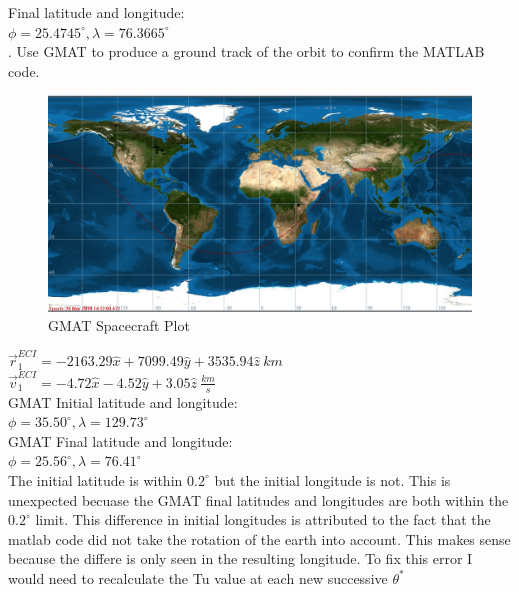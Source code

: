 \documentclass[hidelinks,12pt]{article}
\begin{document}
Final latitude and longitude:\\
$\phi = 25.4745^\circ, \lambda = 76.3665^\circ$\\
\vspace{5px}
. Use GMAT to produce a ground track of the orbit to confirm the MATLAB code.\\
\begin{figure}[!htb]
  \center
  \includegraphics[scale=0.6]{GMAT}
  \caption{GMAT Spacecraft Plot}
  \label{}
\end{figure}
$\vec{r}_1^{ECI} = -2163.29 \hat{x} + 7099.49 \hat{y} + 3535.94 \hat{z}~km$\\
$\vec{v}_1^{ECI} = -4.72 \hat{x} - 4.52 \hat{y} + 3.05 \hat{z}~\frac{km}{s}$\\
\vspace{2px}
GMAT Initial latitude and longitude:\\
$\phi = 35.50^\circ, \lambda = 129.73^\circ$\\
GMAT Final latitude and longitude:\\
$\phi = 25.56^\circ, \lambda = 76.41^\circ$\\
The initial latitude is within $0.2^\circ$ but the initial longitude is not. This is unexpected becuase the GMAT final latitudes and longitudes are both within the $0.2^\circ$ limit.
This difference in initial longitudes is attributed to the fact that the matlab code did not take the rotation of the earth into account. This makes sense because the differe is only seen in the resulting longitude. To fix this error I would need to recalculate the Tu value at each new successive $\theta^*$
\vspace{5px}

\newpage

\end{document}

